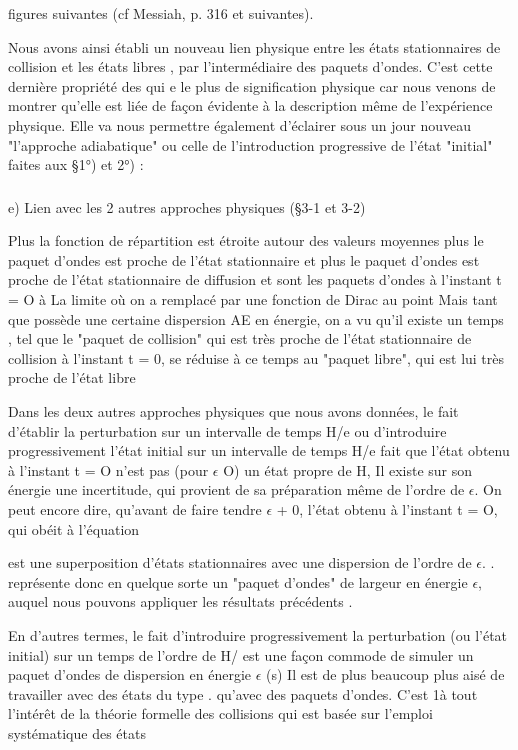 figures suivantes (cf Messiah, p. 316 et suivantes).


Nous avons ainsi établi un nouveau lien physique entre les
états stationnaires de collision  et les états libres  , par
l'intermédiaire des paquets d'ondes. C'est cette dernière propriété des
 qui e le plus de signification physique car nous venons de montrer
qu'elle est liée de façon évidente à la description même de l'expérience
physique. Elle va nous permettre également d'éclairer sous un jour nouveau
"l'approche adiabatique" ou celle de l'introduction progressive de l'état
"initial" faites aux \S 1°) et 2°) :

\subsubsection{}%
e) Lien avec les 2 autres approches physiques (\S 3-1 et 3-2)

Plus la fonction de répartition  est étroite autour
des valeurs moyennes  plus le paquet d'ondes  est proche
de l'état stationnaire  et plus le paquet d'ondes  est proche
de l'état stationnaire de diffusion  et  sont les
paquets d'ondes à l'instant t = O à La limite où on a remplacé 
par une fonction de Dirac au point  Mais tant que  possède
une certaine dispersion AE en énergie, on a vu qu'il existe un temps
, tel que le "paquet de collision" qui est très proche de l'état
stationnaire de collision à l'instant t = 0, se réduise à ce temps au "paquet libre",
qui est lui très proche de l'état libre 

Dans les deux autres approches physiques que nous avons données,
le fait d'établir la perturbation sur un intervalle de temps H/e ou d'introduire
progressivement l'état initial sur un intervalle de temps H/e
fait que l'état obtenu à l'instant t = O n'est pas (pour $\epsilon$  O) un état
propre de H, Il existe sur son énergie une incertitude, qui provient de sa
préparation même de l'ordre de $\epsilon$. On peut encore dire, qu'avant de faire
tendre $\epsilon$ + 0, l'état obtenu à l'instant t = O,  qui obéit à l'équation 


est une superposition d'états stationnaires  avec une dispersion
de l'ordre de $\epsilon$. . représente donc en quelque sorte un "paquet
d'ondes" de largeur en énergie $\epsilon$, auquel nous pouvons appliquer les résultats précédents .

En d'autres termes, le fait d'introduire progressivement la
perturbation (ou l'état initial) sur un temps de l'ordre de H/ est une
façon commode de simuler un paquet d'ondes de dispersion en énergie $\epsilon$ (s)
Il est de plus beaucoup plus aisé de travailler avec des états du type
. qu'avec des paquets d'ondes. C'est 1à tout l'intérêt de la
théorie formelle des collisions qui est basée sur l'emploi systématique
des états 

